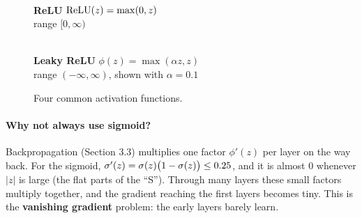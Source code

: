 \documentclass[12pt, a4paper]{article}
\begin{document}
\begin{figure}[H]
  \begin{minipage}[b]{0.48\textwidth}
    \centering
    \\[2pt]
    \textbf{ReLU} \quad $\mathrm{ReLU}(z) = \max(0, z)$\\
    {\small range $[0, \infty)$}
  \end{minipage}\hfill
  \begin{minipage}[b]{0.48\textwidth}
    \centering
    \\[2pt]
    \textbf{Leaky ReLU} \quad $\phi(z) = \max(\alpha z, z)$\\
    {\small range $(-\infty, \infty)$, shown with $\alpha = 0.1$}
  \end{minipage}
  \caption{Four common activation functions.}
  \label{fig:activations}
\end{figure}

\paragraph{Why not always use sigmoid?}
Backpropagation (Section 3.3) multiplies one factor $\phi'(z)$ per layer on
the way back. For the sigmoid, $\sigma'(z) = \sigma(z)\bigl(1-\sigma(z)\bigr)
  \le 0.25$, and it is almost $0$ whenever $|z|$ is large (the flat parts of the
``S''). Through many layers these small factors multiply together, and the
gradient reaching the first layers becomes tiny. This is the
\textbf{vanishing gradient} problem: the early layers barely learn.
\end{document}
